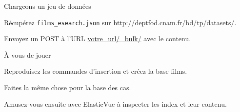 \begin{frame}{Chargeons un  jeu de données}

Récupérez \texttt{films\_esearch.json}
sur  {http://deptfod.cnam.fr/bd/tp/datasets/}. 

\vfill 

Envoyez un POST à l’URL \url{votre_url/\_bulk/} avec le contenu.
\vfill

\centerline{}

\end{frame}



\begin{frame}{À vous de jouer}

\vfill 

Reproduisez les commandes d'insertion et créez la base films.

\vfill

Faites la même chose pour la base des cas.

\vfill

Amusez-vous ensuite avec ElasticVue à inspecter les index et leur contenu.

\end{frame}



